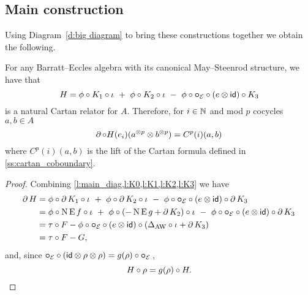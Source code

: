 \subsection{Main construction}

Using Diagram~\eqref{d:big diagram} to bring these constructions together we obtain the following.

\begin{theorem}
	For any Barratt--Eccles algebra with its canonical May--Steenrod structure, we have that
	\[
	H = \phi \comp K_1 \comp \iota \ +\ \phi \comp K_2 \comp \iota \ -\ \phi \comp \bcomp_{\BE} \comp (e \ot \id) \comp K_3
	\]
	is a natural Cartan relator for $A$.
	Therefore, for $i \in \N$ and mod $p$ cocycles $a,b \in A$
	\[
	\bd \comp H(e_i)(a^{\ot p} \ot b^{\ot p}) = C^p(i)(a, b)
	\]
	where $C^p(i)(a, b)$ is the lift of the Cartan formula defined in {\rm \cref{ss:cartan_coboundary}}.
\end{theorem}

\begin{proof} Combining \cref{l:main_diag,l:K0,l:K1,l:K2,l:K3} we have
	\begin{align*}
		\bd H &=
		\phi \comp \bd K_1 \comp \iota \ +\
		\phi \comp \bd K_2 \comp \iota \ -\
		\phi \comp \bcomp_{\BE} \comp (e \ot \id) \comp \bd K_3 \\ &=
		\phi \comp \chains\EE f \comp \iota \ +\
		\phi \comp (-\chains\EE g + \bd K_2) \comp \iota \ -\
		\phi \comp \bcomp_{\BE} \comp (e \ot \id) \comp \bd K_3 \\ &=
		\tau \comp F - \phi \comp \bcomp_{\BE} \comp (e \ot \id) \comp (\Delta_{\AW} \comp \iota + \bd K_3) \\ &=
		\tau \comp F - G,
	\end{align*}
	and, since $\bcomp_{\BE} \comp (\id \ot \rho \ot \rho) = g(\rho) \comp \bcomp_{\BE}$\,,
	\[
	H \comp \rho = g(\rho) \comp H. \qedhere
	\]
\end{proof}